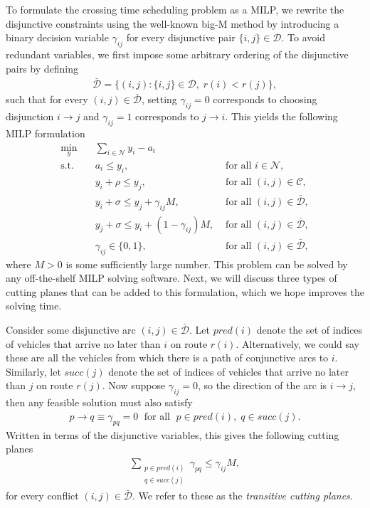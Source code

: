 \documentclass[a4paper]{article}
\theoremstyle{definition}
\theoremstyle{plain}
\begin{document}
To formulate the crossing time scheduling problem as a MILP, we rewrite the
disjunctive constraints using the well-known big-M method by introducing a
binary decision variable $\gamma_{ij}$ for every disjunctive pair
$\{i, j\} \in \mathcal{D}$.
%
To avoid redundant variables, we first impose some arbitrary ordering of the
disjunctive pairs by defining
\begin{align*}
  \bar{\mathcal{D}} = \{ (i,j) : \{i,j\} \in \mathcal{D}, \; r(i) < r(j) \} ,
\end{align*}
such that for every $(i,j) \in \bar{\mathcal{D}}$, setting $\gamma_{ij} = 0$
corresponds to choosing disjunction $i \rightarrow j$ and $\gamma_{ij} = 1$ corresponds to
$j \rightarrow i$. This yields the following MILP formulation
%
\begin{align*}
  \min_{y} \quad & \sum_{i \in \mathcal{N}} y_{i} - a_{i} & \\
  \text{s.t.} \quad & a_{i} \leq y_{i} , & \text{ for all } i \in \mathcal{N} , \\
  & y_{i} + \rho \leq y_{j} , & \text{ for all } (i,j) \in \mathcal{C} , \\
  & y_{i} + \sigma \leq y_{j} + \gamma_{ij}M , & \text{ for all } (i,j) \in \bar{\mathcal{D}} , \\
  & y_{j} + \sigma \leq y_{i} + (1 - \gamma_{ij})M , & \text{ for all } (i,j) \in \bar{\mathcal{D}} , \\
  & \gamma_{ij} \in \{0, 1\} , & \text{ for all } (i,j) \in \bar{\mathcal{D}} ,
\end{align*}
where $M > 0$ is some sufficiently large number. This problem can be solved by
any off-the-shelf MILP solving software. Next, we will discuss three types of
cutting planes that can be added to this formulation, which we hope improves the
solving time.

Consider some disjunctive arc $(i,j) \in \bar{\mathcal{D}}$. Let
$\mathit{pred}(i)$ denote the set of indices of vehicles that arrive no later
than $i$ on route $r(i)$. Alternatively, we could say
these are all the vehicles from which there is a path of conjunctive arcs to
$i$. Similarly, let $\mathit{succ}(j)$ denote the set of indices of vehicles
that arrive no later than $j$ on route $r(j)$.
%
Now suppose $\gamma_{ij} = 0$, so the direction of the arc is $i \rightarrow j$,
then any feasible solution must also satisfy
\begin{align*}
  p \rightarrow q \equiv \gamma_{pq} = 0 \; \text{ for all } \; p \in \mathit{pred}(i), \; q \in \mathit{succ}(j) .
\end{align*}
Written in terms of the disjunctive variables, this gives the following cutting
planes
\begin{align*}
  \sum_{\substack{p \in \mathit{pred}(i)\\ q \in \mathit{succ}(j)}} \gamma_{pq} \leq \gamma_{ij} M ,
\end{align*}
for every conflict $(i,j) \in \bar{\mathcal{D}}$. We refer to these as
the \textit{transitive cutting planes}.
\end{document}
